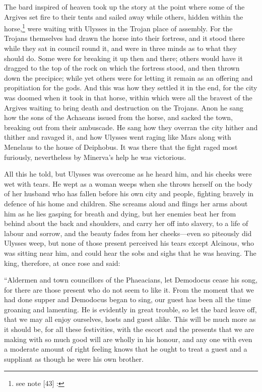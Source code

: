 The bard inspired of heaven took up the story at the point where some of the
Argives set fire to their tents and sailed away while others, hidden within the
horse,\footnote{see note [43] :} were
waiting with Ulysses in the Trojan place of assembly. For the Trojans
themselves had drawn the horse into their fortress, and it stood there while
they sat in council round it, and were in three minds as to what they should
do. Some were for breaking it up then and there; others would have it dragged
to the top of the rock on which the fortress stood, and then thrown down the
precipice; while yet others were for letting it remain as an offering and
propitiation for the gods. And this was how they settled it in the end, for the
city was doomed when it took in that horse, within which were all the bravest
of the Argives waiting to bring death and destruction on the Trojans. Anon he
sang how the sons of the Achaeans issued from the horse, and sacked the town,
breaking out from their ambuscade. He sang how they overran the city hither and
thither and ravaged it, and how Ulysses went raging like Mars along with
Menelaus to the house of Deiphobus. It was there that the fight raged most
furiously, nevertheless by Minerva’s help he was victorious.

All this he told, but Ulysses was overcome as he heard him, and his cheeks were
wet with tears. He wept as a woman weeps when she throws herself on the body of
her husband who has fallen before his own city and people, fighting bravely in
defence of his home and children. She screams aloud and flings her arms about
him as he lies gasping for breath and dying, but her enemies beat her from
behind about the back and shoulders, and carry her off into slavery, to a life
of labour and sorrow, and the beauty fades from her cheeks—even so piteously
did Ulysses weep, but none of those present perceived his tears except
Alcinous, who was sitting near him, and could hear the sobs and sighs that he
was heaving. The king, therefore, at once rose and said:

“Aldermen and town councillors of the Phaeacians, let Demodocus cease his song,
for there are those present who do not seem to like it. From the moment that we
had done supper and Demodocus began to sing, our guest has been all the time
groaning and lamenting. He is evidently in great trouble, so let the bard leave
off, that we may all enjoy ourselves, hosts and guest alike. This will be much
more as it should be, for all these festivities, with the escort and the
presents that we are making with so much good will are wholly in his honour,
and any one with even a moderate amount of right feeling knows that he ought to
treat a guest and a suppliant as though he were his own brother.

